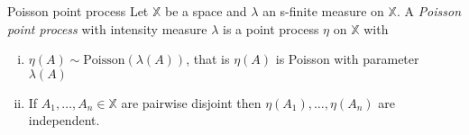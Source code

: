 \documentclass{article}
\begin{document}
\begin{definition}[]{Poisson point process}
    Let $\mathbb{X}$ be a space and $\lambda$ an s-finite measure on $\mathbb{X}$. A {\it Poisson point process} 
    with intensity measure $\lambda$ is a point process $\eta$ on $\mathbb{X}$ with
    \begin{enumerate}[(i)]
        \item $\eta(A) \sim \text{Poisson}(\lambda(A))$, that is $\eta(A)$ is Poisson with parameter $\lambda(A)$
        \item If $A_1, \dots, A_n \in \mathbb{X}$ are pairwise disjoint then $\eta(A_1), \dots, \eta(A_n)$ 
        are independent.
    \end{enumerate}
\end{definition}

\newpage


 
\end{document}
